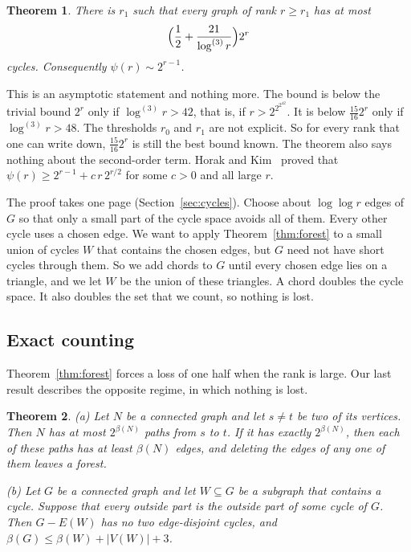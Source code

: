 \documentclass[11pt]{article}
\newtheorem{theorem}{Theorem}[section]
\theoremstyle{definition}
\theoremstyle{remark}
\newcommand{\lgk}[1]{\log^{(#1)}}
\begin{document}
\begin{theorem}\label{thm:cycles}
There is $r_1$ such that every graph of rank $r\ge r_1$ has at most
\[
  \Bigl(\frac12+\frac{21}{\lgk{3}r}\Bigr)2^{r}
\]
cycles. Consequently $\psi(r)\sim2^{r-1}$.
\end{theorem}

This is an asymptotic statement and nothing more. The bound is below the trivial bound $2^{r}$ only
if $\lgk3r>42$, that is, if $r>2^{2^{2^{42}}}$. It is below $\frac{15}{16}2^{r}$ only if
$\lgk3r>48$. The thresholds $r_0$ and $r_1$ are not explicit. So for every rank that one can write
down, $\frac{15}{16}2^{r}$ is still the best bound known. The theorem also says nothing about the
second-order term. Horak and Kim~\cite{HK} proved that $\psi(r)\ge2^{r-1}+c\,r\,2^{r/2}$ for some
$c>0$ and all large $r$.

The proof takes one page (Section~\ref{sec:cycles}). Choose about $\log\log r$ edges of $G$ so that
only a small part of the cycle space avoids all of them. Every other cycle uses a chosen edge. We
want to apply Theorem~\ref{thm:forest} to a small union of cycles $W$ that contains the chosen
edges, but $G$ need not have short cycles through them. So we add chords to $G$ until every chosen
edge lies on a triangle, and we let $W$ be the union of these triangles. A chord doubles the cycle
space. It also doubles the set that we count, so nothing is lost.

\subsection{Exact counting}

Theorem~\ref{thm:forest} forces a loss of one half when the rank is large. Our last result describes
the opposite regime, in which nothing is lost.

\begin{theorem}\label{thm:exact}
\textup{(a)} Let $N$ be a connected graph and let $s\ne t$ be two of its vertices. Then $N$ has at
most $2^{\beta(N)}$ paths from $s$ to $t$. If it has exactly $2^{\beta(N)}$, then each of these paths
has at least $\beta(N)$ edges, and deleting the edges of any one of them leaves a forest.

\textup{(b)} Let $G$ be a connected graph and let $W\subseteq G$ be a subgraph that contains a cycle.
Suppose that every outside part is the outside part of some cycle of $G$. Then $G-E(W)$ has no two
edge-disjoint cycles, and $\beta(G)\le\beta(W)+|V(W)|+3$.
\end{theorem}
\end{document}
